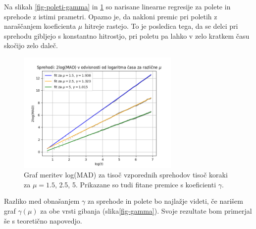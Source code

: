 \documentclass[a4paper, 12pt, slovene]{article}
\begin{document}
Na slikah \ref{fig-poleti-gamma}  in \ref{fig-sprehodi-gamma} so narisane linearne regresije za polete in sprehode z istimi prametri. Opazno je, da nakloni premic pri poletih z naraščanjem koeficienta $\mu$ hitreje rastejo. To je posledica tega, da se delci pri sprehodu gibljejo s konstantno hitrostjo, pri poletu pa lahko v zelo kratkem času skočijo zelo daleč.

\begin{figure}[H]
\centering
\includegraphics[width=0.7\textwidth]{grafi/sprehod-1000-1000.png}
\caption{Graf meritev log(MAD) za tisoč vzporednih sprehodov tisoč koraki za $\mu = 1.5$, 2.5, 5. Prikazane so tudi fitane premice s koeficienti $\gamma$.}
\label{fig-sprehodi-gamma}
\end{figure} \par\vspace{5mm}


Razliko med obnašanjem $\gamma$ za sprehode in polete bo najlažje videti, če narišem graf $\gamma(\mu)$ za obe vrsti gibanja (slika\ref{fig-gamma}). Svoje rezultate bom primerjal še s teoretično napovedjo.
\end{document}
